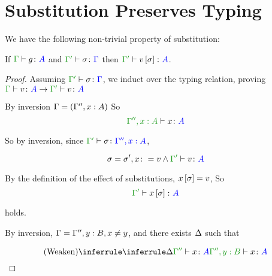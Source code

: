 \documentclass{report}
\begin{document}
   
    

\section{Substitution Preserves Typing}
We have the following non-trivial property of substitution:


\begin{theorem}\label{SubsTyping}

    If $\typerelation{\G}{g}{A}$ and $\typerelation{\G'}{\si}{\G}$ then $\typerelation{\G'}{v\ssi}{A}$.
\end{theorem}



\begin{framed}
    \begin{proof}
        
        Assuming $\typerelation{\G'}{\si}{\G}$, we induct over the typing relation, proving $\gtyperelation{v}{A}\rightarrow\typerelation{\G'}{v}{A}$
        
                By inversion $\Gamma = (\Gamma'', x:A)$
                So \begin{equation}
                    \typerelation{\G'',x:A}{x}{A}
                \end{equation}
        
                So by inversion, since $\typerelation{\G'}{\si}{\G'', x:A}$, 
        
                \begin{equation}
                    \si = \si', x\setto v \wedge \typerelation{\G'}{v}{A}
                \end{equation}
        
                By the definition of the effect of substitutions, $x\left[\sigma\right] = v$, So
                \begin{equation}
                    \typerelation{\G'}{x\ssi}{A}
                \end{equation}
        
                holds.
                
                By inversion, $\Gamma = \Gamma'', y: B, x \neq y$, and there exists $\Delta$ such that
        
                \begin{equation}
                    \ntreeruleI{Weaken}{\treeruleI{\D}{\typerelation{\G''}{x}{A}}}{\typerelation{\G'', y: B}{x}{A}}
                \end{equation}
        

\end{proof}
\end{framed}
\end{document}

